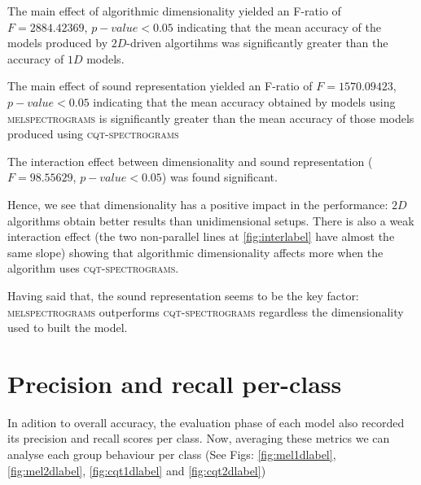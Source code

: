 
The main effect of algorithmic dimensionality yielded an F-ratio of $F=2884.42369$, $p-value < 0.05$ indicating that the mean accuracy of the models produced by $2D$-driven algortihms was significantly greater than the accuracy of $1D$ models.

The main effect of sound representation yielded an F-ratio of $F=1570.09423$, $p-value < 0.05$ indicating that the mean accuracy obtained by models using \textsc{melspectrograms} is significantly greater than the mean accuracy of those models produced using \textsc{cqt-spectrograms}

The interaction effect between dimensionality and sound representation ($F = 98.55629$, $p-value < 0.05$) was found significant.

Hence, we see that dimensionality has a positive impact in the performance: $2D$ algorithms obtain better results than unidimensional setups. There is also a weak interaction effect (the two non-parallel lines at \ref{fig:interlabel} have almost the same slope) showing that algorithmic dimensionality affects more when the algorithm uses \textsc{cqt-spectrograms}.

Having said that, the sound representation seems to be the key factor: \textsc{melspectrograms} outperforms \textsc{cqt-spectrograms} regardless the dimensionality used to built the model.

\section{Precision and recall per-class}

In adition to overall accuracy, the evaluation phase of each model also recorded its precision and recall scores per class. Now, averaging these metrics we can analyse each group behaviour per class (See Figs: \ref{fig:mel1dlabel}, \ref{fig:mel2dlabel}, \ref{fig:cqt1dlabel} and \ref{fig:cqt2dlabel})





